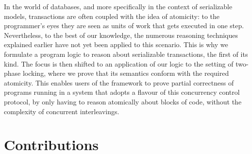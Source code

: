 In the world of databases, and more specifically in the context of serializable models, transactions are often coupled with the idea of atomicity: to the programmer's eyes they are seen as units of work that gets executed in one step. Nevertheless, to the best of our knowledge, the numerous reasoning techniques explained earlier have not yet been applied to this scenario. This is why we formulate a program logic to reason about serializable transactions, the first of its kind. The focus is then shifted to an application of our logic to the setting of two-phase locking, where we prove that its semantics conform with the required atomicity. This enables users of the framework to prove partial correctness of  programs running in a system that adopts a flavour of this concurrency control protocol, by only having to reason atomically about blocks of code, without the complexity of concurrent interleavings. 

\section{Contributions}

